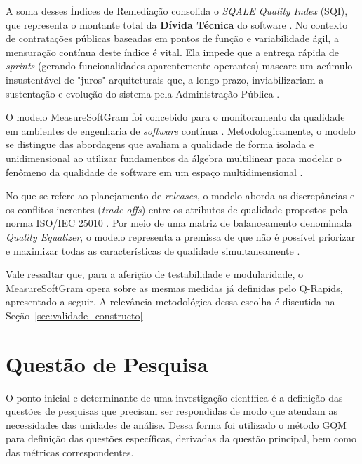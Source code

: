 A soma desses Índices de Remediação consolida o \textit{SQALE Quality Index} (SQI), que representa o montante total da \textbf{Dívida Técnica} do software \cite{letouzey2010}. No contexto de contratações públicas baseadas em pontos de função e variabilidade ágil, a mensuração contínua deste índice é vital. Ela impede que a entrega rápida de \textit{sprints} (gerando funcionalidades aparentemente operantes) mascare um acúmulo insustentável de "juros" arquiteturais que, a longo prazo, inviabilizariam a sustentação e evolução do sistema pela Administração Pública \cite{letouzey2010}.


O modelo MeasureSoftGram \cite{neri2018, neri2020} foi concebido para o monitoramento da qualidade em ambientes de engenharia de \textit{software} contínua \cite{fitzgerald2015continuous}. Metodologicamente, o modelo se distingue das abordagens que avaliam a qualidade de forma isolada e unidimensional ao utilizar fundamentos da álgebra multilinear para modelar o fenômeno da qualidade de software em um espaço multidimensional \cite{neri2020}.

No que se refere ao planejamento de \textit{releases}, o modelo aborda as discrepâncias e os conflitos inerentes (\textit{trade-offs}) entre os atributos de qualidade propostos pela norma ISO/IEC 25010 \cite{neri2018}. Por meio de uma matriz de balanceamento denominada \textit{Quality Equalizer}, o modelo representa a premissa de que não é possível priorizar e maximizar todas as características de qualidade simultaneamente \cite{neri2018, neri2020}.

Vale ressaltar que, para a aferição de testabilidade e modularidade, o MeasureSoftGram opera sobre as mesmas medidas já definidas pelo Q-Rapids, apresentado a seguir. A relevância metodológica dessa escolha é discutida na Seção~\ref{sec:validade_constructo}


\section{Questão de Pesquisa}

O ponto inicial e determinante de uma investigação científica é a definição das questões de pesquisas que precisam ser respondidas de modo que atendam as necessidades das unidades de análise. Dessa forma foi utilizado o método GQM para definição das questões específicas, derivadas da questão principal, bem como das métricas correspondentes.

